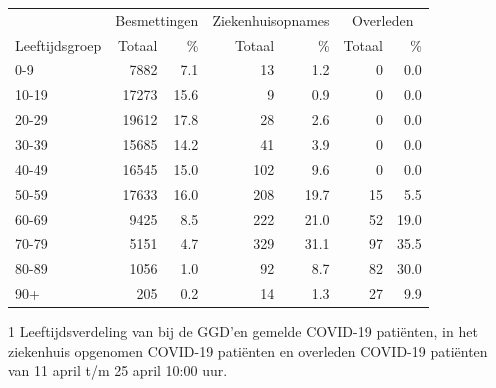 \documentclass[
  english,
  man,floatsintext]{apa6}
\begin{document}
\begin{table}
\centering\begingroup\fontsize{11}{13}\selectfont

\begin{threeparttable}
\begin{tabular}{lrrrrrr}
\toprule
\multicolumn{1}{c}{ } & \multicolumn{2}{c}{Besmettingen} & \multicolumn{2}{c}{Ziekenhuisopnames} & \multicolumn{2}{c}{Overleden} \\
\cmidrule(l{3pt}r{3pt}){2-3} \cmidrule(l{3pt}r{3pt}){4-5} \cmidrule(l{3pt}r{3pt}){6-7}
Leeftijdsgroep & Totaal & \% & Totaal & \% & Totaal & \%\\
\midrule
0-9 & 7882 & 7.1 & 13 & 1.2 & 0 & 0.0\\
10-19 & 17273 & 15.6 & 9 & 0.9 & 0 & 0.0\\
20-29 & 19612 & 17.8 & 28 & 2.6 & 0 & 0.0\\
30-39 & 15685 & 14.2 & 41 & 3.9 & 0 & 0.0\\
40-49 & 16545 & 15.0 & 102 & 9.6 & 0 & 0.0\\
50-59 & 17633 & 16.0 & 208 & 19.7 & 15 & 5.5\\
60-69 & 9425 & 8.5 & 222 & 21.0 & 52 & 19.0\\
70-79 & 5151 & 4.7 & 329 & 31.1 & 97 & 35.5\\
80-89 & 1056 & 1.0 & 92 & 8.7 & 82 & 30.0\\
90+ & 205 & 0.2 & 14 & 1.3 & 27 & 9.9\\
\bottomrule
\end{tabular}
\begin{tablenotes}
\item[1] Leeftijdsverdeling van bij de GGD’en gemelde COVID-19 patiënten, in het ziekenhuis opgenomen COVID-19 patiënten en overleden COVID-19 patiënten van 11 april t/m 25 april 10:00 uur.
\end{tablenotes}
\end{threeparttable}
\endgroup{}
\end{table}

\newpage
\end{document}
